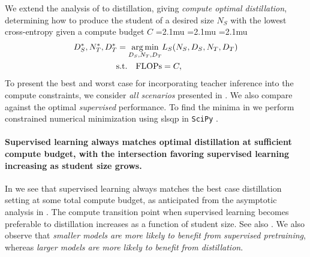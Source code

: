 We extend the analysis of \citet{DBLP:journals/corr/abs-2203-15556} to distillation, giving \emph{compute optimal distillation},
determining how to produce the student of a desired size $N_S$ with the lowest cross-entropy given a compute budget $C${
		\medmuskip=2.1mu
		\thinmuskip=2.1mu
		\thickmuskip=2.1mu
		\begin{align}
			D_S^*,N_T^*,D_T^*=\operatorname*{arg\,min}_{D_S,N_T,D_T}&L_S(N_S,D_S,N_T,D_T)\nonumber \\
			\mathrm{s.t.} \quad \mathrm{FLOPs}&=C,
			\label{eq:distillation-optimal}
		\end{align}
	}To present the best and worst case for incorporating teacher inference into the compute constraints, we consider
\emph{all scenarios} presented in .
We also compare against the optimal \emph{supervised} performance.
To find the minima in  we perform constrained numerical minimization using \gls{slsqp} \citep{kraft1988software} in \texttt{SciPy} \citep{DBLP:journals/corr/abs-1907-10121}.

\paragraph{Supervised learning always matches optimal  distillation at sufficient compute budget, with the  intersection favoring supervised learning increasing as student size grows.}
In  we see that supervised learning always matches the best case distillation setting at some total compute budget, as anticipated from the asymptotic analysis in
.
The compute transition point when supervised learning becomes preferable to distillation increases
as a function of student size.
See also .
We also observe that \emph{smaller models are more likely to benefit from supervised pretraining}, whereas
\emph{larger models are more likely to benefit from distillation}.

